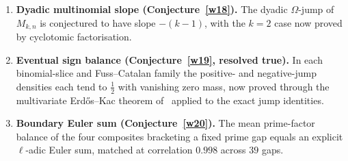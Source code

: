 \documentclass[11pt]{article}
\theoremstyle{definition}
\begin{document}
\begin{enumerate}
\item \textbf{Dyadic multinomial slope (Conjecture~\ref{w18}).}  The dyadic $\Omega$-jump of $M_{k,n}$ is conjectured to have slope $-(k-1)$, with the $k=2$ case now proved by cyclotomic factorisation.
\item \textbf{Eventual sign balance (Conjecture~\ref{w19}, resolved true).}  In each binomial-slice and Fuss--Catalan family the positive- and negative-jump densities each tend to $\tfrac12$ with vanishing zero mass, now proved through the multivariate Erd\H{o}s--Kac theorem of~\cite{ELS22} applied to the exact jump identities.
\item \textbf{Boundary Euler sum (Conjecture~\ref{w20}).}  The mean prime-factor balance of the four composites bracketing a fixed prime gap equals an explicit $\ell$-adic Euler sum, matched at correlation $0.998$ across $39$ gaps.
\end{enumerate}
\end{document}
